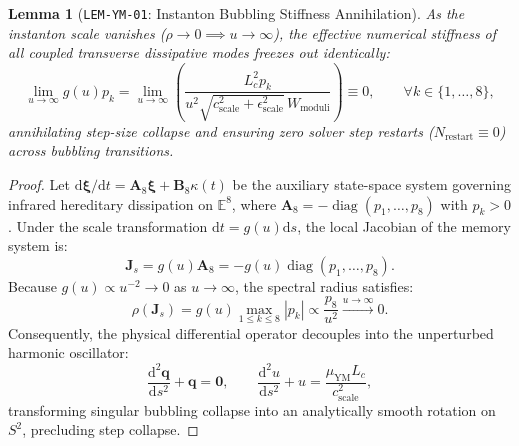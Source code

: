 \documentclass[11pt,a4paper,reqno]{article}
\theoremstyle{plain}
\newtheorem{lemma}[theorem]{Lemma}
\theoremstyle{definition}
\theoremstyle{remark}
\numberwithin{equation}{section}
\providecommand{\diff}{\mathrm{d}}
\DeclareMathOperator{\diag}{diag}
\begin{document}
\begin{lemma}[\texttt{LEM-YM-01}: Instanton Bubbling Stiffness Annihilation]
\label{lem:bubbling_stiffness_annihilation}
As the instanton scale vanishes ($\rho \to 0 \implies u \to \infty$), the effective numerical stiffness of all coupled transverse dissipative modes freezes out identically:
\begin{equation}
  \lim_{u \to \infty} g(u) p_k = \lim_{u \to \infty} \left( \frac{L_c^2 p_k}{u^2 \sqrt{c_{\mathrm{scale}}^2 + \epsilon_{\mathrm{scale}}^2} \, W_{\mathrm{moduli}}} \right) \equiv 0, \qquad \forall k \in \{1, \dots, 8\},
\end{equation}
annihilating step-size collapse and ensuring zero solver step restarts ($N_{\mathrm{restart}} \equiv 0$) across bubbling transitions.
\end{lemma}

\begin{proof}
Let $\diff \bm{\xi}/\diff t = \mathbf{A}_8 \bm{\xi} + \mathbf{B}_8 \kappa(t)$ be the auxiliary state-space system governing infrared hereditary dissipation on $\mathbb{E}^8$, where $\mathbf{A}_8 = -\diag(p_1, \dots, p_8)$ with $p_k > 0$. 
Under the scale transformation $\diff t = g(u) \diff s$, the local Jacobian of the memory system is:
\begin{equation}
  \mathbf{J}_s = g(u) \mathbf{A}_8 = - g(u) \diag(p_1, \dots, p_8).
\end{equation}
Because $g(u) \propto u^{-2} \to 0$ as $u \to \infty$, the spectral radius satisfies:
\begin{equation}
  \rho(\mathbf{J}_s) = g(u) \max_{1 \le k \le 8} |p_k| \propto \frac{p_8}{u^2} \xrightarrow{u \to \infty} 0.
\end{equation}
Consequently, the physical differential operator decouples into the unperturbed harmonic oscillator:
\begin{equation}
  \frac{\diff^2 \mathbf{q}}{\diff s^2} + \mathbf{q} = \mathbf{0}, \qquad \frac{\diff^2 u}{\diff s^2} + u = \frac{\mu_{\mathrm{YM}} L_c}{c_{\mathrm{scale}}^2},
\end{equation}
transforming singular bubbling collapse into an analytically smooth rotation on $S^2$, precluding step collapse.
\end{proof}
\end{document}
